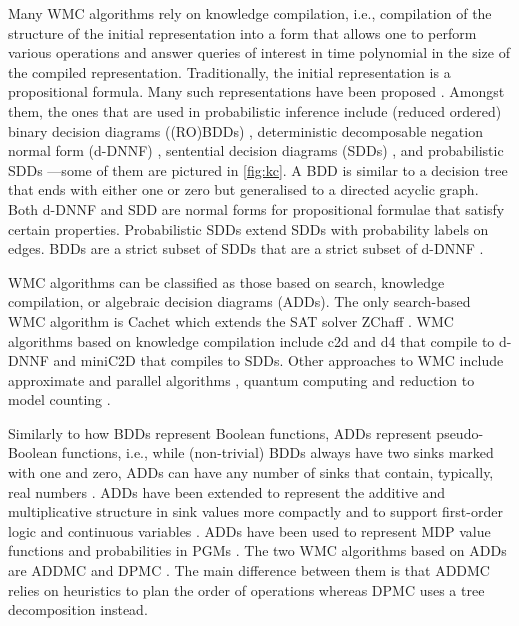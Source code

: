 \documentclass{article}
\begin{document}
{Many WMC algorithms rely on knowledge compilation, i.e., compilation of the
structure of the initial representation into a form that allows one to perform
various operations and answer queries of interest in time polynomial in the size
of the compiled representation. Traditionally, the initial representation is a
propositional formula. Many such representations have been proposed
\cite{DBLP:journals/jair/DarwicheM02}. Amongst them, the ones that are used in
probabilistic inference include (reduced ordered) binary decision diagrams
((RO)BDDs) \cite{DBLP:journals/tc/Bryant86}, deterministic decomposable negation
normal form (d-DNNF) \cite{DBLP:journals/jancl/Darwiche01}, sentential decision
diagrams (SDDs) \cite{DBLP:conf/ijcai/Darwiche11}, and probabilistic SDDs
\cite{DBLP:conf/kr/KisaBCD14}---some of them are pictured in \cref{fig:kc}. A
BDD is similar to a decision tree that ends with either one or zero but
generalised to a directed acyclic graph. Both d-DNNF and SDD are normal forms
for propositional formulae that satisfy certain properties. Probabilistic SDDs
extend SDDs with probability labels on edges. BDDs are a strict subset of SDDs
that are a strict subset of d-DNNF \cite{DBLP:conf/ijcai/Darwiche11}.

WMC algorithms can be classified as those based on search, knowledge
compilation, or algebraic decision diagrams (ADDs). The only search-based WMC
algorithm is Cachet
\cite{DBLP:conf/sat/SangBBKP04,DBLP:conf/sat/SangBK05,DBLP:conf/aaai/SangBK05}
which extends the SAT solver ZChaff
\cite{DBLP:conf/dac/MoskewiczMZZM01,DBLP:conf/iccad/ZhangMMM01}. WMC algorithms
based on knowledge compilation include c2d \cite{DBLP:conf/ecai/Darwiche04} and
d4 \cite{DBLP:conf/ijcai/LagniezM17} that compile to d-DNNF and miniC2D
\cite{DBLP:conf/ijcai/OztokD15} that compiles to SDDs. Other approaches to WMC
include approximate \cite{DBLP:conf/aaai/RenkensKBR14} and parallel algorithms
\cite{DBLP:conf/pgm/DalLL18,DBLP:conf/esa/FichteHWZ18}, quantum computing
\cite{DBLP:conf/ecai/Riguzzi20} and reduction to model counting
\cite{DBLP:conf/ijcai/ChakrabortyFMV15}.

Similarly to how BDDs represent Boolean functions, ADDs represent pseudo-Boolean
functions, i.e., while (non-trivial) BDDs always have two sinks marked with one
and zero, ADDs can have any number of sinks that contain, typically, real
numbers \cite{DBLP:journals/fmsd/BaharFGHMPS97}. ADDs have been extended to
represent the additive and multiplicative structure in sink values more
compactly \cite{DBLP:conf/ijcai/SannerM05} and to support first-order logic
\cite{DBLP:journals/ai/SannerB09} and continuous variables
\cite{DBLP:conf/uai/SannerDB11}. ADDs have been used to represent MDP value
functions \cite{DBLP:conf/uai/HoeySHB99} and probabilities in PGMs
\cite{DBLP:conf/ijcai/ChaviraD07,DBLP:conf/uai/GogateD11}. The two WMC
algorithms based on ADDs are ADDMC \cite{DBLP:conf/aaai/DudekPV20} and DPMC
\cite{DBLP:conf/cp/DudekPV20}. The main difference between them is that ADDMC
relies on heuristics to plan the order of operations whereas DPMC uses a tree
decomposition instead.

}
\end{document}
